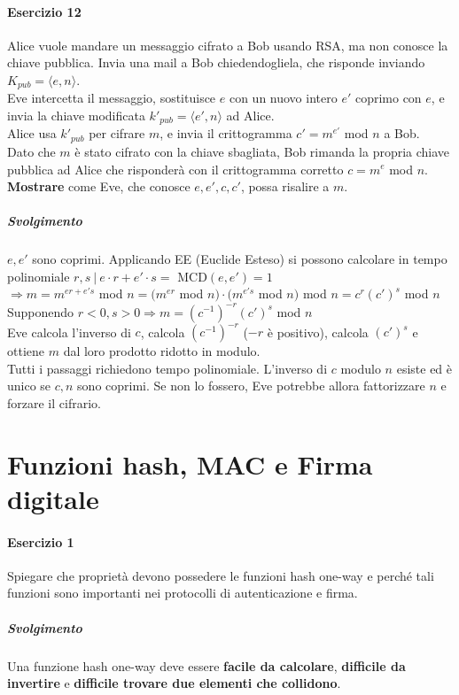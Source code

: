 \documentclass[10pt]{book}
\begin{document}
\paragraph{Esercizio 12} Alice vuole mandare un messaggio cifrato a Bob usando RSA, ma non conosce la chiave pubblica. Invia una mail a Bob chiedendogliela, che risponde inviando $K_{pub} = \langle e,n\rangle$.\\
Eve intercetta il messaggio, sostituisce $e$ con un nuovo intero $e'$ coprimo con $e$, e invia la chiave modificata $k'_{pub} = \langle e',n\rangle$ ad Alice.\\
Alice usa $k'_{pub}$ per cifrare $m$, e invia il crittogramma $c' = m^{e'}$ mod $n$ a Bob.\\
Dato che $m$ è stato cifrato con la chiave sbagliata, Bob rimanda la propria chiave pubblica ad Alice che risponderà con il crittogramma corretto $c = m^e$ mod $n$.\\
\textbf{Mostrare} come Eve, che conosce $e,e',c,c'$, possa risalire a $m$.
\subparagraph{Svolgimento} $e,e'$ sono coprimi. Applicando EE (Euclide Esteso) si possono calcolare in tempo polinomiale $r,s\:|\:e\cdot r + e'\cdot s =$ MCD$(e,e')=1$\\
$\Rightarrow m = m^{er+e's}$ mod $n = (m^{er}$ mod $n)\cdot(m^{e's}$ mod $n)$ mod $n = c^r(c')^s$ mod $n$\\
Supponendo $r<0,s>0 \Rightarrow m = (c^{-1})^{-r}(c')^s$ mod $n$\\Eve calcola l'inverso di $c$, calcola $(c^{-1})^{-r}$ ($-r$ è positivo), calcola $(c')^s$ e ottiene $m$ dal loro prodotto ridotto in modulo.\\
Tutti i passaggi richiedono tempo polinomiale. L'inverso di $c$ modulo $n$ esiste ed è unico se $c,n$ sono coprimi. Se non lo fossero, Eve potrebbe allora fattorizzare $n$ e forzare il cifrario.
\pagebreak
\section{Funzioni hash, MAC e Firma digitale}
\paragraph{Esercizio 1} Spiegare che proprietà devono possedere le funzioni hash one-way e perché tali funzioni sono importanti nei protocolli di autenticazione e firma.
\subparagraph{Svolgimento} Una funzione hash one-way deve essere \textbf{facile da calcolare}, \textbf{difficile da invertire} e \textbf{difficile trovare due elementi che collidono}.
\end{document}
